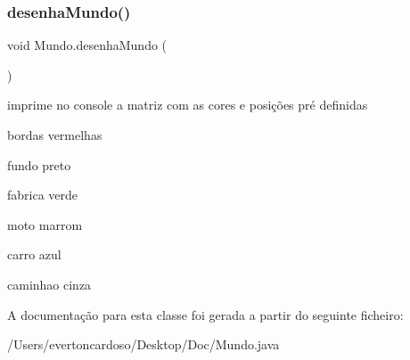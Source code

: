 \subsubsection{\texorpdfstring{desenha\+Mundo()}{desenhaMundo()}}
{\footnotesize\ttfamily void Mundo.\+desenha\+Mundo (\begin{DoxyParamCaption}{ }\end{DoxyParamCaption})}



imprime no console a matriz com as cores e posições pré definidas 

bordas vermelhas

fundo preto

fabrica verde

moto marrom

carro azul

caminhao cinza 

A documentação para esta classe foi gerada a partir do seguinte ficheiro\+:\begin{DoxyCompactItemize}
\item 
/\+Users/evertoncardoso/\+Desktop/\+Doc/Mundo.\+java\end{DoxyCompactItemize}
